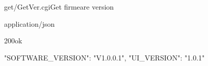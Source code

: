 \documentclass[12pt,a4paper]{article}
\begin{document}
\begin{apiRoute}{get}{/GetVer.cgi}{Get firmeare version}
	
	\begin{routeParameter}
	
	\end{routeParameter}
	\begin{routeResponse}{application/json}
		\begin{routeResponseItem}{200}{ok}
			\begin{routeResponseItemBody}
{
  "SOFTWARE_VERSION": "V1.0.0.1",
  "UI_VERSION": "1.0.1"
}
			\end{routeResponseItemBody}
		\end{routeResponseItem}
	\end{routeResponse}
	
\end{apiRoute}
\end{document}
